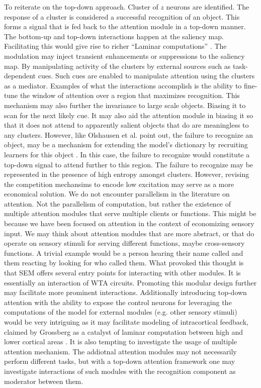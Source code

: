 \documentclass{report}
\begin{document}
To reiterate on the top-down approach. Cluster of $z$ neurons are identified. The response of a cluster is considered a successful recognition of an object. This forms a signal that is fed back to the attention module in a top-down manner. The bottom-up and top-down interactions happen at the saliency map. Facilitating this would give rise to richer ``Laminar computations'' \cite{Grossberg2006}. The modulation may inject transient enhancements or suppressions  to the saliency map. By manipulating activity of the clusters by external sources such as task-dependent cues. Such cues are enabled to manipulate attention using the clusters as a mediator. Examples of what the interactions accomplish is the ability to fine-tune the window of attention over a region that maximizes recognition. This mechanism may also further the invariance to large scale objects. Biasing it to scan for the next likely cue. It may also aid the attention module in biasing it so that it does not attend to apparently salient objects that do are meaningless to any clusters. However, like Olshausen et al. point out, the failure to recognize an object, may be a mechanism for extending the model's dictionary by recruiting learners for this object \cite{Olshausen1993}. In this case, the failure to recognize would constitute a top-down signal to attend further to this region. The failure to recognize may be represented in the presence of high entropy amongst clusters. However, revising the competition mechansims to encode low excitation may serve as a more economical solution.
We do not encounter parallelism in the literature on attention. Not the parallelism of computation, but rather the existence of multiple attention modules that serve multiple clients or functions. This might be because we have been focused on attention in the context of economizing sensory input. We may think about attention modules that are more abstract, or that do operate on sensory stimuli for serving different functions, maybe cross-sensory functions. A trivial example would be a person hearing their name called and them reacting by looking for who called them. What provoked this thought is that SEM offers several entry points for interacting with other modules. It is essentially an interaction of WTA circuits. Promoting this modular design further may facilitate more prominent interactions. Additionally introducing top-down attention with the ability to expose the control neurons for leveraging the computations of the model for external modules (e.g. other sensory stimuli) would be very intriguing as it may facilitate modeling of intracortical feedback, claimed by Grossberg as a catalyst of laminar computation between high and lower cortical areas \cite{Grossberg2006}. It is also tempting to investigate the usage of multiple attention mechanism. The addiotnal attention modules may not necessarily perform different tasks, but with a top-down attention framework one may investigate interactions of such modules with the recognition component as moderator between them.
\end{document}
